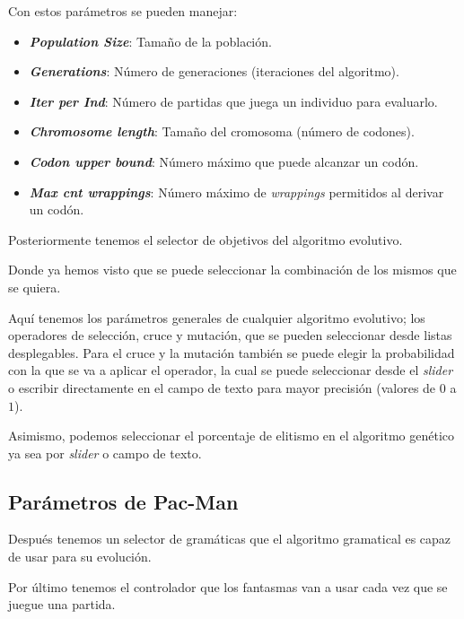 Con estos parámetros se pueden manejar:
\begin{itemize}
\item \textbf{\textit{Population Size}}: Tamaño de la población.

\item \textbf{\textit{Generations}}: Número de generaciones (iteraciones del algoritmo).

\item \textbf{\textit{Iter per Ind}}: Número de partidas que juega un individuo para evaluarlo.

\item \textbf{\textit{Chromosome length}}: Tamaño del cromosoma (número de codones).

\item \textbf{\textit{Codon upper bound}}: Número máximo que puede alcanzar un codón.

\item \textbf{\textit{Max cnt wrappings}}: Número máximo de \textit{wrappings} permitidos al derivar un codón.
\end{itemize}

Posteriormente tenemos el selector de objetivos del algoritmo evolutivo.


Donde ya hemos visto que se puede seleccionar la combinación de los mismos que se quiera.


Aquí tenemos los parámetros generales de cualquier algoritmo evolutivo; los operadores de selección, cruce y mutación, que se pueden seleccionar desde listas desplegables. Para el cruce y la mutación también se puede elegir la probabilidad con la que se va a aplicar el operador, la cual se puede seleccionar desde el \textit{slider} o escribir directamente en el campo de texto para mayor precisión (valores de $0$ a $1$).


Asimismo, podemos seleccionar el porcentaje de elitismo en el algoritmo genético ya sea por \textit{slider} o campo de texto.



\subsection{Parámetros de Pac-Man}
Después tenemos un selector de gramáticas que el algoritmo gramatical es capaz de usar para su evolución.


Por último tenemos el controlador que los fantasmas van a usar cada vez que se juegue una partida.



